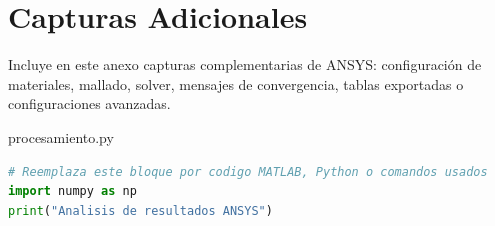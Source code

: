 \chapter{Capturas Adicionales}
Incluye en este anexo capturas complementarias de ANSYS: configuración de materiales, mallado, solver, mensajes de convergencia, tablas exportadas o configuraciones avanzadas.

\begin{codeeditor}{procesamiento.py}
\begin{lstlisting}[language=Python,caption={Ejemplo de bloque de código para procesamiento de datos.}]
# Reemplaza este bloque por codigo MATLAB, Python o comandos usados
import numpy as np
print("Analisis de resultados ANSYS")
\end{lstlisting}
\end{codeeditor}
